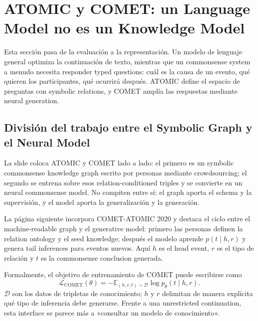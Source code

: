 \section{ATOMIC y COMET: un Language Model no es un Knowledge Model}

Esta sección pasa de la evaluación a la representación. Un modelo de lenguaje general optimiza la continuación de texto, mientras que un commonsense system a menudo necesita responder typed questions: cuál es la causa de un evento, qué quieren los participantes, qué ocurrirá después. ATOMIC define el espacio de preguntas con symbolic relations, y COMET amplía las respuestas mediante neural generation.

\subsection{División del trabajo entre el Symbolic Graph y el Neural Model}

La slide coloca ATOMIC y COMET lado a lado: el primero es un symbolic commonsense knowledge graph escrito por personas mediante crowdsourcing; el segundo se entrena sobre esos relation-conditioned triples y se convierte en un neural commonsense model. No compiten entre sí: el graph aporta el schema y la supervisión, y el model aporta la generalización y la generación.


La página siguiente incorpora COMET-ATOMIC 2020 y destaca el ciclo entre el machine-readable graph y el generative model: primero las personas definen la relation ontology y el seed knowledge; después el modelo aprende $p(t\mid h,r)$ y genera tail inferences para eventos nuevos. Aquí $h$ es el head event, $r$ es el tipo de relación y $t$ es la commonsense conclusion generada.


Formalmente, el objetivo de entrenamiento de COMET puede escribirse como
\begin{equation}
\mathcal{L}_{\mathrm{COMET}}(\theta)
=-\mathbb{E}_{(h,r,t)\sim\mathcal{D}}
\log p_{\theta}(t\mid h,r).
\end{equation}
$\mathcal{D}$ son los datos de tripletas de conocimiento; $h$ y $r$ delimitan de manera explícita qué tipo de inferencia debe generarse. Frente a una unrestricted continuation, esta interface se parece más a «consultar un modelo de conocimiento».

